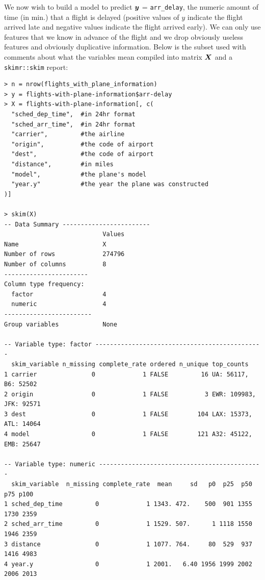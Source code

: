 \documentclass[12pt]{article}
\begin{document}
\begin{enumerate}[(a)]
\pagebreak

We now wish to build a model to predict $\boldsymbol{y}$ = \texttt{arr\_delay}, the numeric amount of time (in min.) that a flight is delayed (positive values of $y$ indicate the flight arrived late and negative values indicate the flight arrived early). We can only use features that we know in advance of the flight and we drop obviously useless features and obviously duplicative information. Below is the subset used with comments about what the variables mean compiled into matrix $\boldsymbol{X}$ and a \texttt{skimr::skim} report:

\begin{Verbatim}[fontsize=\small]
> n = nrow(flights_with_plane_information)
> y = flights-with-plane-information$arr-delay
> X = flights-with-plane-information[, c(
  "sched_dep_time",  #in 24hr format
  "sched_arr_time",  #in 24hr format
  "carrier",         #the airline
  "origin",          #the code of airport
  "dest",            #the code of airport
  "distance",        #in miles
  "model",           #the plane's model
  "year.y"           #the year the plane was constructed
)]

> skim(X)
-- Data Summary ------------------------
                           Values
Name                       X     
Number of rows             274796
Number of columns          8     
-----------------------          
Column type frequency:           
  factor                   4     
  numeric                  4     
------------------------         
Group variables            None  

-- Variable type: factor ----------------------------------------------
  skim_variable n_missing complete_rate ordered n_unique top_counts                                    
1 carrier               0             1 FALSE         16 UA: 56117, B6: 52502
2 origin                0             1 FALSE          3 EWR: 109983, JFK: 92571
3 dest                  0             1 FALSE        104 LAX: 15373, ATL: 14064
4 model                 0             1 FALSE        121 A32: 45122, EMB: 25647

-- Variable type: numeric ---------------------------------------------
  skim_variable  n_missing complete_rate  mean     sd   p0  p25  p50  p75 p100
1 sched_dep_time         0             1 1343. 472.    500  901 1355 1730 2359
2 sched_arr_time         0             1 1529. 507.      1 1118 1550 1946 2359
3 distance               0             1 1077. 764.     80  529  937 1416 4983
4 year.y                 0             1 2001.   6.40 1956 1999 2002 2006 2013
\end{Verbatim}
\pagebreak


\end{enumerate}
\end{document}
